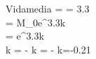 Vida\hspace{0.1cm}media =  = 3.3
\\
 = M_0e^{3.3k}
\\
 = e^{3.3k}
\\
k = - \Longrightarrow k = - \Longrightarrow k=-0.21
\\

